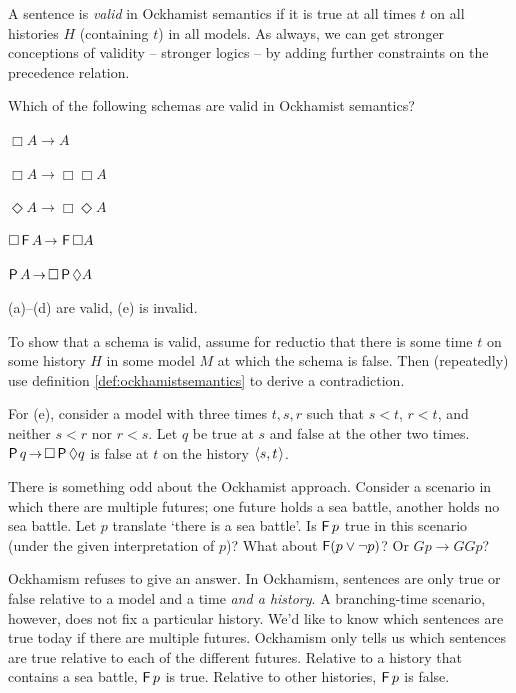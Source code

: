 
A sentence is \emph{valid} in Ockhamist semantics if it is true at all times $t$
on all histories $H$ (containing $t$) in all models. As always, we can get
stronger conceptions of validity -- stronger logics -- by adding further
constraints on the precedence relation.


\begin{exercise}
  Which of the following schemas are valid in Ockhamist semantics?
  \begin{exlist}
  \item $\Box A \to A$
  \item $\Box A \to \Box\Box A$
  \item $\Diamond A \to \Box\Diamond A$
  \item $\Box \tF A \to \tF\Box A$
  \item $\tP A \to \Box \tP \Diamond A$%
  \end{exlist}
\end{exercise}
\begin{solution}
  (a)--(d) are valid, (e) is invalid.

  To show that a schema is valid, assume for reductio that there is some time
  $t$ on some history $H$ in some model $M$ at which the schema is false. Then
  (repeatedly) use definition \ref{def:ockhamistsemantics} to derive a
  contradiction.

  For (e), consider a model with three times $t,s,r$ such that $s < t$,
  $r< t$, and neither $s < r$ nor $r< s$. Let $q$ be true at $s$ and
  false at the other two times. $\tP q \to \Box \tP \Diamond q$ is false at $t$
  on the history $\t{s,t}$.
\end{solution}

There is something odd about the Ockhamist approach. Consider a scenario in
which there are multiple futures; one future holds a sea battle, another holds
no sea battle. Let $p$ translate `there is a sea battle'. Is $\operatorname{\mathsf{F}} p$ true in
this scenario (under the given interpretation of $p$)? What about
$\operatorname{\mathsf{F}}(p \lor \neg p)$? Or $Gp \to GGp$?

Ockhamism refuses to give an answer. In Ockhamism, sentences are only true or
false relative to a model and a time \emph{and a history}. A branching-time
scenario, however, does not fix a particular history. We'd like to know which
sentences are true today if there are multiple futures. Ockhamism only tells us
which sentences are true relative to each of the different futures. Relative to
a history that contains a sea battle, $\operatorname{\mathsf{F}} p$ is true. Relative to other
histories, $\operatorname{\mathsf{F}} p$ is false.

